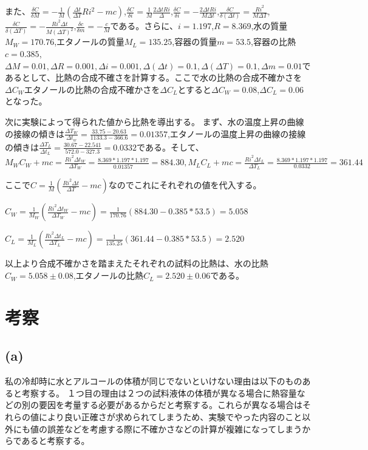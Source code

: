 \documentclass{jsarticle}
\begin{document}
また、$\frac{\delta C}{\delta M} = -\frac{1}{M}(\frac{\Delta t}{\Delta T}Ri^2-mc)$,$\frac{\delta C}{\delta i} = \frac{1}{M}\frac{2\Delta tRi}{\Delta}$,$\frac{\delta C}{\delta i} = -\frac{2\Delta tRi}{M\Delta t}$,$\frac{\delta C}{\delta(\Delta t)} = \frac{Ri^2}{M\Delta T}$,$\frac{\delta C}{\delta(\Delta T)}=-\frac{Ri^2\Delta t}{M(\Delta T)^2}$,$\frac{\delta c}{\delta m}=-\frac{c}{M}$である。さらに、$i = 1.197$,$R = 8.369$,水の質量$M_W = 170.76$,エタノールの質量$M_L  = 135.25$,容器の質量$m = 53.5$,容器の比熱$c = 0.385$,$\Delta M = 0.01 , \Delta R = 0.001 , \Delta i = 0.001 , \Delta(\Delta t) = 0.1 , \Delta(\Delta T) = 0.1 , \Delta m = 0.01$であるとして、比熱の合成不確さを計算する。ここで水の比熱の合成不確かさを$\Delta C_W$エタノールの比熱の合成不確かさを$\Delta C_L$とすると$\Delta C_W = 0.08$,$\Delta C_L = 0.06$となった。

次に実験によって得られた値から比熱を導出する。
まず、水の温度上昇の曲線の接線の傾きは$\frac{\Delta T_W}{\Delta t_w} = \frac{33.75-20.63}{1133.3-366.6} = 0.01357$,エタノールの温度上昇の曲線の接線の傾きは$\frac{\Delta T_L}{\Delta t_L} = \frac{30.67-22.541}{572.0-327.3} = 0.0332$である。そして、$M_WC_W + mc = \frac{Ri^2\Delta t_W}{\Delta T_W} = \frac{8.369*1.197*1.197}{0.01357} = 884.30,M_LC_L + mc = \frac{Ri^2\Delta t_L}{\Delta T_L} = \frac{8.369*1.197*1.197}{0.0332} = 361.44$

ここで$C = \frac{1}{M}(\frac{Ri^2\Delta t}{\Delta T}-mc)$なのでこれにそれぞれの値を代入する。

$C_W = \frac{1}{M_W}(\frac{Ri^2\Delta t_W}{\Delta T_W}-mc) = \frac{1}{170.76}(884.30-0.385*53.5) = 5.058$

$C_L = \frac{1}{M_L}(\frac{Ri^2\Delta t_L}{\Delta T_L}-mc) = \frac{1}{135.25}(361.44-0.385*53.5) = 2.520$


以上より合成不確かさを踏まえたそれぞれの試料の比熱は、水の比熱$C_W = 5.058 \pm 0.08$,エタノールの比熱$C_L = 2.520 \pm 0.06$である。



\section{考察}

\subsection{(a)}
私の冷却時に水とアルコールの体積が同じでないといけない理由は以下のものあると考察する。
１つ目の理由は２つの試料液体の体積が異なる場合に熱容量などの別の要因を考量する必要があるからだと考察する。これらが異なる場合はそれらの値により良い正確さが求められてしまうため、実験でやった内容のこと以外にも値の誤差などを考慮する際に不確かさなどの計算が複雑になってしまうからであると考察する。
\end{document}
